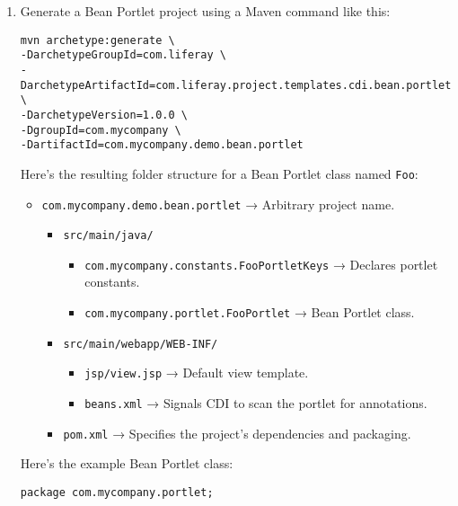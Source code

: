 \begin{enumerate}
\def\labelenumi{\arabic{enumi}.}
\item
  Generate a Bean Portlet project using a Maven command like this:

\begin{verbatim}
mvn archetype:generate \
-DarchetypeGroupId=com.liferay \
-DarchetypeArtifactId=com.liferay.project.templates.cdi.bean.portlet \
-DarchetypeVersion=1.0.0 \
-DgroupId=com.mycompany \
-DartifactId=com.mycompany.demo.bean.portlet
\end{verbatim}

  Here's the resulting folder structure for a Bean Portlet class named
  \texttt{Foo}:

  \begin{itemize}
  \tightlist
  \item
    \texttt{com.mycompany.demo.bean.portlet} → Arbitrary project name.

    \begin{itemize}
    \tightlist
    \item
      \texttt{src/main/java/}

      \begin{itemize}
      \tightlist
      \item
        \texttt{com.mycompany.constants.FooPortletKeys} → Declares
        portlet constants.
      \item
        \texttt{com.mycompany.portlet.FooPortlet} → Bean Portlet class.
      \end{itemize}
    \item
      \texttt{src/main/webapp/WEB-INF/}

      \begin{itemize}
      \tightlist
      \item
        \texttt{jsp/view.jsp} → Default view template.
      \item
        \texttt{beans.xml} → Signals CDI to scan the portlet for
        annotations.
      \end{itemize}
    \item
      \texttt{pom.xml} → Specifies the project's dependencies and
      packaging.
    \end{itemize}
  \end{itemize}

  Here's the example Bean Portlet class:

\begin{verbatim}
package com.mycompany.portlet;


\end{verbatim}
\end{enumerate}
